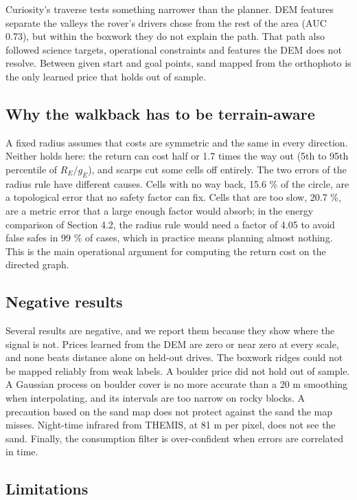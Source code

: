 \documentclass[11pt,a4paper]{article}
\begin{document}
Curiosity's traverse tests something narrower than the planner. DEM features separate the valleys the rover's drivers chose from the rest of the area (AUC 0.73), but within the boxwork they do not explain the path. That path also followed science targets, operational constraints and features the DEM does not resolve. Between given start and goal points, sand mapped from the orthophoto is the only learned price that holds out of sample.

\subsection{Why the walkback has to be terrain-aware}

A fixed radius assumes that costs are symmetric and the same in every direction. Neither holds here: the return can cost half or 1.7 times the way out (5th to 95th percentile of $R_E/g_E$), and scarps cut some cells off entirely. The two errors of the radius rule have different causes. Cells with no way back, 15.6 \% of the circle, are a topological error that no safety factor can fix. Cells that are too slow, 20.7 \%, are a metric error that a large enough factor would absorb; in the energy comparison of Section 4.2, the radius rule would need a factor of 4.05 to avoid false safes in 99 \% of cases, which in practice means planning almost nothing. This is the main operational argument for computing the return cost on the directed graph.

\subsection{Negative results}

Several results are negative, and we report them because they show where the signal is not. Prices learned from the DEM are zero or near zero at every scale, and none beats distance alone on held-out drives. The boxwork ridges could not be mapped reliably from weak labels. A boulder price did not hold out of sample. A Gaussian process on boulder cover is no more accurate than a 20 m smoothing when interpolating, and its intervals are too narrow on rocky blocks. A precaution based on the sand map does not protect against the sand the map misses. Night-time infrared from THEMIS, at 81 m per pixel, does not see the sand. Finally, the consumption filter is over-confident when errors are correlated in time.

\subsection{Limitations}
\end{document}
